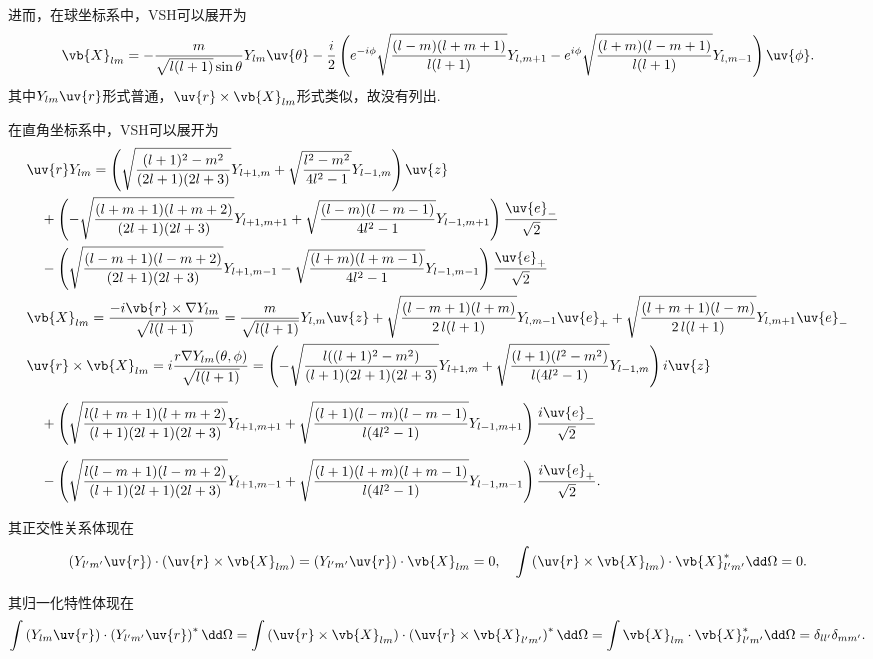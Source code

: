 进而，在球坐标系中，VSH可以展开为
\begin{align*}
	\vb{X}_{lm} = -\frac{m}{\sqrt{l(l+1)} \sin\theta} Y_{lm} \uv{\theta} - \frac{i}{2} \left( e^{-i\phi} \sqrt{\frac{(l-m)(l+m+1)}{l(l+1)}} Y_{l,m+1} - e^{i\phi} \sqrt{\frac{(l+m)(l-m+1)}{l(l+1)}} Y_{l,m-1} \right) \uv{\phi}.
\end{align*}
其中\(Y_{lm}\uv{r}\)形式普通，\(\uv{r} \times \vb{X}_{lm}\)形式类似，故没有列出.

在直角坐标系中，VSH可以展开为
\begin{align*}
	&\uv{r} Y_{lm} = \left(
	\sqrt{\frac{(l + 1)^2 - m^2}{(2 l + 1) (2 l + 3)}} Y_{l + 1, m} +
	\sqrt{\frac{l^2 - m^2}{4 l^2 - 1}} Y_{l - 1, m}
	\right) \uv{z} \\&\quad+
	\left(
	-\sqrt{\frac{(l + m + 1) (l + m + 2)}{(2 l + 1) (2 l + 3)}} Y_{l + 1, m + 1} +
	\sqrt{\frac{(l - m) (l - m - 1)}{4 l^2 - 1}} Y_{l - 1, m + 1}
	\right) \frac{\uv{e}_-}{\sqrt{2}} \\&\quad-
	\left(
	\sqrt{\frac{(l - m + 1) (l - m + 2)}{(2 l + 1) (2 l + 3)}} Y_{l + 1, m - 1} -
	\sqrt{\frac{(l + m) (l + m - 1)}{4 l^2 - 1}} Y_{l - 1, m - 1}
	\right) \frac{\uv{e}_+}{\sqrt{2}}\\
	&\vb{X}_{lm}=\frac{-i \vb{r}\times \nabla Y_{lm}}{\sqrt{l(l+1)}}=\frac{m}{\sqrt{l(l+1)}}Y_{l,m}\uv{z}+\sqrt{\frac{(l-m+1)(l+m)}{2\,l(l+1)}}Y_{l,m-1}\uv{e}_++\sqrt{\frac{(l+m+1)(l-m)}{2\,l(l+1)}}Y_{l,m+1}\uv{e}_-\\
	&\uv{r}\times\vb{X}_{lm}=i\frac{r\nabla Y_{lm}(\theta,\phi)}{\sqrt{l(l+1)}}=\left(-\sqrt{\frac{l((l+1)^2-m^2)}{(l+1)(2l+1)(2l+3)}}Y_{l+1,m}+\sqrt{\frac{(l+1)(l^2-m^2)}{l(4l^2-1)}}Y_{l-1,m}\right)i\uv{z}\\[6pt]
	&\quad+\left(\sqrt{\frac{l(l+m+1)(l+m+2)}{(l+1)(2l+1)(2l+3)}}Y_{l+1,m+1}+\sqrt{\frac{(l+1)(l-m)(l-m-1)}{l(4l^2-1)}}Y_{l-1,m+1}\right)\frac{i\uv{e}_-}{\sqrt{2}}\\[6pt]
	&\quad-\left(\sqrt{\frac{l(l-m+1)(l-m+2)}{(l+1)(2l+1)(2l+3)}}Y_{l+1,m-1}+\sqrt{\frac{(l+1)(l+m)(l+m-1)}{l(4l^2-1)}}Y_{l-1,m-1}\right)\frac{i\uv{e}_+}{\sqrt{2}}.
\end{align*}

其正交性关系体现在
\begin{align*}
	\left(Y_{l'm'} \uv{r}\right) \cdot \left(\uv{r} \times \vb{X}_{lm}\right) = \left(Y_{l'm'} \uv{r}\right) \cdot \vb{X}_{lm} = 0,\quad
	\int \left(\uv{r} \times \vb{X}_{lm}\right) \cdot \vb{X}_{l'm'}^* \dd \Omega = 0.
\end{align*}

其归一化特性体现在
\begin{align*}
	\int \left(Y_{lm} \uv{r}\right) \cdot \left(Y_{l'm'} \uv{r}\right)^* \dd \Omega =
	\int \left(\uv{r} \times \vb{X}_{lm}\right) \cdot \left(\uv{r} \times \vb{X}_{l'm'}\right)^* \dd \Omega =
	\int \vb{X}_{lm} \cdot \vb{X}_{l'm'}^* \dd \Omega = \delta_{ll'} \delta_{mm'}.
\end{align*}

